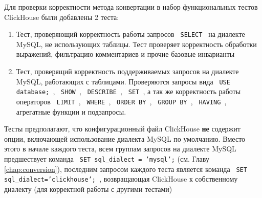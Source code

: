 Для проверки корректности метода конвертации в набор функциональных тестов ClickHouse были добавлены 2 теста:
\begin{enumerate}
    \item Тест, проверяющий корректность работы запросов \texttt{ SELECT } на диалекте MySQL, не использующих таблицы. Тест проверяет корректность обработки выражений, фильтрацию комментариев и прочие базовые инварианты
    \item Тест, проверящий корректность поддерживаемых запросов на диалекте MySQL, работающих с таблицами. Проверяются запросы вида \texttt{ USE database; }, \texttt{ SHOW }, \texttt{ DESCRIBE }, \texttt{ SET }, а так же корректность работы операторов \texttt{ LIMIT }, \texttt{ WHERE }, \texttt{ ORDER BY }, \texttt{ GROUP BY }, \texttt{ HAVING }, агрегатные функции и подзапросы.
\end{enumerate}

Тесты предполагают, что конфигурационный файл ClickHouse \textbf{не} содержит опции, включающей использование диалекта MySQL по умолчанию. Вместо этого в начале каждого теста, всем группам запросов на диалекте MySQL предшествует команда \texttt{ SET sql_dialect = 'mysql';} (см. Главу \ref{chap:conversion}), последним запросом каждого теста является команда \texttt{ SET sql_dialect='clickhouse'; }, возвращающая ClickHouse к собственному диалекту (для корректной работы с другими тестами)
